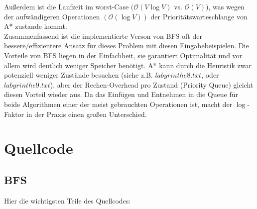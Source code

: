 \documentclass[a4paper,10pt,ngerman]{scrartcl}
\begin{document}
Außerdem ist die Laufzeit im worst-Case $(\mathcal{O}(V \log V)$ vs. $\mathcal{O}(V)$), was wegen der aufwändigeren Operationen $(\mathcal{O}(\log V))$ der Prioritätswarteschlange von A* zustande kommt.\\
Zusammenfassend ist die implementierte Verson von BFS oft der bessere/effizientere Ansatz für dieses Problem mit diesen Eingabebeispielen. Die Vorteile von BFS liegen in der Einfachheit, sie garantiert Optimalität und vor allem wird deutlich weniger Speicher benötigt. A* kann durch die Heuristik zwar potenziell weniger Zustände besuchen (siehe z.B. $labyrinthe8.txt$, oder $labyrinthe9.txt$), aber der Rechen-Overhead pro Zustand (Priority Queue) gleicht diesen Vorteil wieder aus. Da das Einfügen und Entnehmen in die Queue für beide Algorithmen einer der meist gebrauchten Operationen ist, macht der $\log$-Faktor in der Praxis einen großen Unterschied.


\section{Quellcode}
\subsection{BFS}
Hier die wichtigsten Teile des Quellcodes:\\
\end{document}
